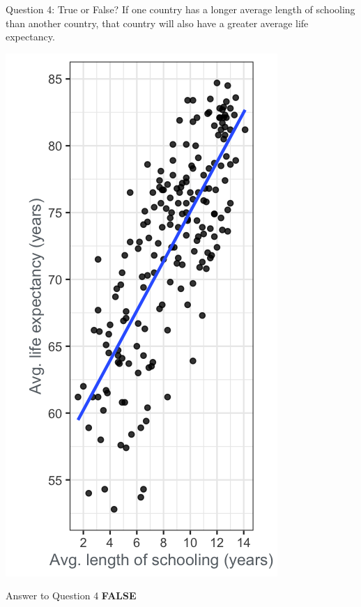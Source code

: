 \documentclass[
  ignorenonframetext,
]{beamer}
\begin{document}
\begin{frame}{Question 4: True or False?}
\label{question-4-true-or-false}
If one country has a longer average length of schooling than another
country, that country will also have a greater average life expectancy.

\includegraphics{../images/im40.png}
\end{frame}

\begin{frame}{Answer to Question 4}
\label{answer-to-question-4}
\textbf{FALSE}
\end{frame}
\end{document}
